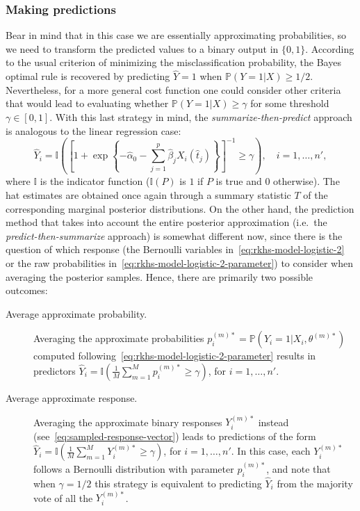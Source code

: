 \documentclass{article}
\numberwithin{equation}{section}
\theoremstyle{plain}
\begin{document}
\subsubsection*{Making predictions}

Bear in mind that in this case we are essentially approximating probabilities, so we need to transform the predicted values to a binary output in \(\{0, 1\}\). According to the usual criterion of minimizing the misclassification probability, the Bayes optimal rule is recovered by predicting \(\hat Y=1\) when \(\mathbb P(Y=1|X) \geq 1/2\). Nevertheless, for a more general cost function one could consider other criteria that would lead to evaluating whether \(\mathbb P(Y=1|X) \geq \gamma\) for some threshold \(\gamma\in[0, 1]\). With this last strategy in mind, the \textit{summarize-then-predict} approach is analogous to the linear regression case:
\begin{equation}\label{eq:summarize-predict-logistic}
  \hat Y_i = \mathbb I \left( \left[\displaystyle 1 + \exp\left\{-\hat\alpha_0 - \sum_{j=1}^p \hat\beta_j X_i(\hat t_j)\right\}\right]^{-1} \geq \gamma \right), \quad i=1,\dots,n',
\end{equation}
where \(\mathbb I\) is the indicator function (\(\mathbb I(P)\) is \(1\) if \(P\) is true and \(0\) otherwise). The hat estimates are obtained once again through a summary statistic \(T\) of the corresponding marginal posterior distributions. On the other hand, the prediction method that takes into account the entire posterior approximation (i.e.\ the \textit{predict-then-summarize} approach) is somewhat different now, since there is the question of which response (the Bernoulli variables in~\eqref{eq:rkhs-model-logistic-2} or the raw probabilities in~\eqref{eq:rkhs-model-logistic-2-parameter}) to consider when averaging the posterior samples. Hence, there are primarily two possible outcomes:
\begin{description}
  \item[Average approximate probability.] Averaging the approximate probabilities \(p_i^{(m)*} = \mathbb P(Y_i =1 | X_i,\theta^{(m)*})\) computed following~\eqref{eq:rkhs-model-logistic-2-parameter} results in predictors \(\hat Y_i = \mathbb I(\frac{1}{M} \sum_{m=1}^M p_i^{(m)*} \geq \gamma)\), for \(i=1,\dots,n'\).
  \item[Average approximate response.] Averaging the approximate binary responses \(Y_i^{(m)*}\) instead (see~\eqref{eq:sampled-response-vector}) leads to predictions of the form \(\hat Y_i = \mathbb I(\frac{1}{M} \sum_{m=1}^M Y_i^{(m)*} \geq \gamma)\), for \(i=1,\dots,n'\). In this case, each \(Y_i^{(m)*}\) follows a Bernoulli distribution with parameter \(p_i^{(m)*}\), and note that when \(\gamma=1/2\) this strategy is equivalent to predicting \(\hat Y_i\) from the majority vote of all the \(Y_i^{(m)*}\).
\end{description}
\end{document}
